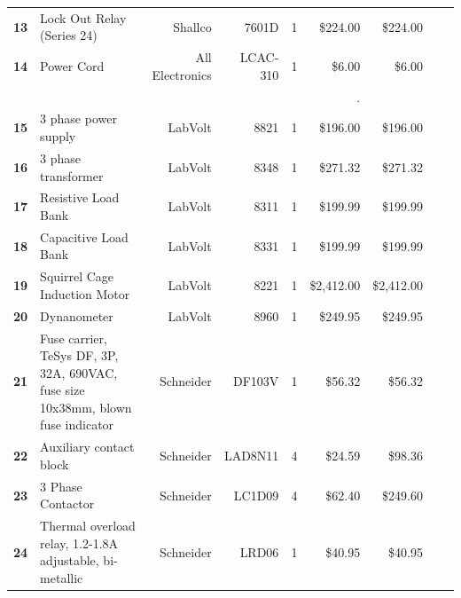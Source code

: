 \begin{table}[!htp]
{\begin{tabular}{llrrrrrrr}
			\textbf{13}    & Lock Out Relay (Series 24)                                                       & Shallco           & 7601D             & 1  & \$224.00   & \$224.00   \\
			\textbf{14}    & Power Cord                                                                       & All Electronics   & LCAC-310          & 1  & \$6.00     & \$6.00     \\
			\textbf{}      &                                                                                  &                   &                   &    & .          &            \\
			\textbf{15}    & 3 phase power supply                                                             & LabVolt           & 8821              & 1  & \$196.00   & \$196.00   \\
			\textbf{16}    & 3 phase transformer                                                              & LabVolt           & 8348              & 1  & \$271.32   & \$271.32   \\
			\textbf{17}    & Resistive Load Bank                                                              & LabVolt           & 8311              & 1  & \$199.99   & \$199.99   \\
			\textbf{18}    & Capacitive Load Bank                                                             & LabVolt           & 8331              & 1  & \$199.99   & \$199.99   \\
			\textbf{19}    & Squirrel Cage Induction Motor                                                    & LabVolt           & 8221              & 1  & \$2,412.00 & \$2,412.00 \\
			\textbf{20}    & Dynanometer                                                                      & LabVolt           & 8960              & 1  & \$249.95   & \$249.95   \\
			\textbf{21}    & Fuse carrier, TeSys DF, 3P, 32A, 690VAC, fuse size 10x38mm, blown fuse indicator & Schneider         & DF103V            & 1  & \$56.32    & \$56.32    \\
			\textbf{22}    & Auxiliary contact block                                                          & Schneider         & LAD8N11           & 4  & \$24.59    & \$98.36    \\
			\textbf{23}    & 3 Phase Contactor                                                                & Schneider         & LC1D09            & 4  & \$62.40    & \$249.60   \\
			\textbf{24}    & Thermal overload relay, 1.2-1.8A adjustable, bi-metallic                         & Schneider         & LRD06             & 1  & \$40.95    & \$40.95    \\

\end{tabular}}
\end{table}
